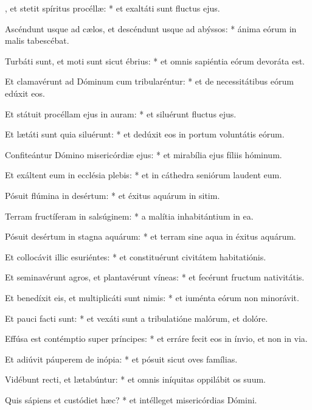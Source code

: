 \begin{psalmus}

, et stetit spíritus procéllæ: * et exaltáti sunt fluctus ejus.

Ascéndunt usque ad cælos, et descéndunt usque ad abýssos: * ánima eórum in malis tabescébat.

Turbáti sunt, et moti sunt sicut ébrius: * et omnis sapiéntia eórum devoráta est.

Et clamavérunt ad Dóminum cum tribularéntur: * et de necessitátibus eórum edúxit eos.

Et státuit procéllam ejus in auram: * et siluérunt fluctus ejus.

Et lætáti sunt quia siluérunt: * et dedúxit eos in portum voluntátis eórum.

Confiteántur Dómino misericórdiæ ejus: * et mirabília ejus fíliis hóminum.

Et exáltent eum in ecclésia plebis: * et in cáthedra seniórum laudent eum.

Pósuit flúmina in desértum: * et éxitus aquárum in sitim.

Terram fructíferam in salsúginem: * a malítia inhabitántium in ea.

Pósuit desértum in stagna aquárum: * et terram sine aqua in éxitus aquárum.

Et collocávit illic esuriéntes: * et constituérunt civitátem habitatiónis.

Et seminavérunt agros, et plantavérunt víneas: * et fecérunt fructum nativitátis.

Et benedíxit eis, et multiplicáti sunt nimis: * et iuménta eórum non minorávit.

Et pauci facti sunt: * et vexáti sunt a tribulatióne malórum, et dolóre.

Effúsa est contémptio super príncipes: * et erráre fecit eos in ínvio, et non in via.

Et adiúvit páuperem de inópia: * et pósuit sicut oves famílias.

Vidébunt recti, et lætabúntur: * et omnis iníquitas oppilábit os suum.

Quis sápiens et custódiet hæc? * et intélleget misericórdias Dómini.

\end{psalmus}
